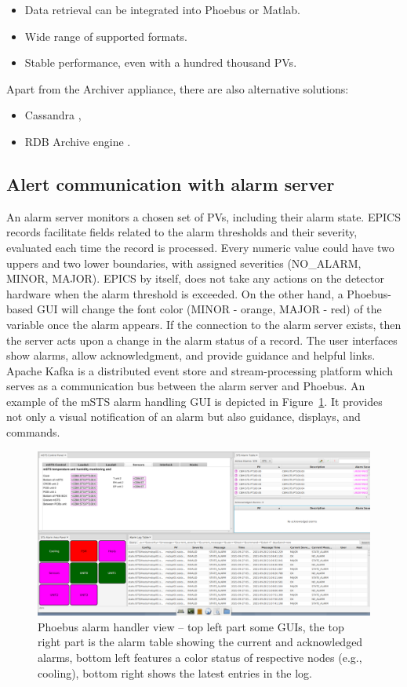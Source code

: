\begin{itemize}
    \item Data retrieval can be integrated into Phoebus or Matlab.
    \item Wide range of supported formats.
    \item Stable performance, even with a hundred thousand \glspl{PV}.
\end{itemize}

Apart from the Archiver appliance, there are also alternative solutions:

\begin{itemize}
    \item Cassandra \cite{cassandra_archive},
    \item RDB Archive engine \cite{rdb_archive}.
\end{itemize}

\subsection{Alert communication with alarm server}
An alarm server monitors a chosen set of \glspl{PV}, including their alarm state. \gls{EPICS} records facilitate fields related to the alarm thresholds and their severity, evaluated each time the record is processed. Every numeric value could have two uppers and two lower boundaries, with assigned severities (NO\_ALARM, MINOR, MAJOR). \gls{EPICS} by itself, does not take any actions on the detector hardware when the alarm threshold is exceeded. On the other hand, a Phoebus-based \gls{GUI} will change the font color (MINOR - orange, MAJOR - red) of the variable once the alarm appears. If the connection to the alarm server exists, then the server acts upon a change in the alarm status of a record. The user interfaces show alarms, allow acknowledgment, and provide guidance and helpful links. Apache Kafka is a distributed event store and stream-processing platform which serves as a communication bus between the alarm server and Phoebus. An example of the \gls{mSTS} alarm handling \gls{GUI} is depicted in Figure~\ref{fig_alarm1}. It provides not only a visual notification of an alarm but also guidance, displays, and commands.
\begin{figure}[!h]
\centering
\includegraphics[width=1\columnwidth]{Chapter4/images/alarms.png}
\caption{Phoebus alarm handler view --  top left part some \gls{GUI}s, the top right part is the alarm table showing the current and acknowledged alarms, bottom left features a color status of respective nodes (e.g., cooling), bottom right shows the latest entries in the log.}
\label{fig_alarm1}
\end{figure}
\newpage
